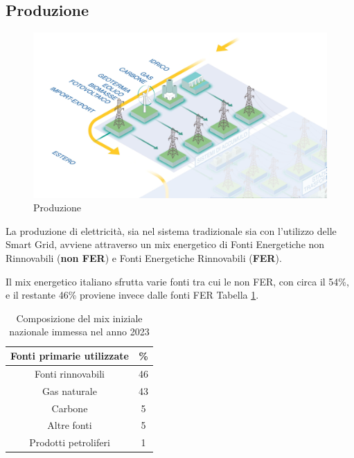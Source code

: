 
\newpage
\subsection{Produzione}

\begin{figure}[t]
    \centering
    \includegraphics[width=0.9\linewidth]{img/Terna-Produzione.png}
    \caption{Produzione}
\end{figure}

La produzione di elettricità, sia nel sistema tradizionale sia con l'utilizzo delle Smart Grid, avviene attraverso un mix energetico di Fonti Energetiche non Rinnovabili (\textbf{non FER}) e Fonti Energetiche Rinnovabili (\textbf{FER}).

Il mix energetico italiano sfrutta varie fonti tra cui le non FER, con circa il 54\%, e il restante 46\% proviene invece dalle fonti FER Tabella \ref{tab:GSE-mix-nazionale-2023}.


\begin{table}[h!]
    \renewcommand{\arraystretch}{1.2}
    \centering
    \begin{tabular}{c|c}
         Fonti primarie utilizzate	& \% \\
         \hline
         Fonti rinnovabili & 46 \\
         Gas naturale& 43 \\
         Carbone& 5 \\
         Altre fonti & 5 \\
         Prodotti petroliferi& 1 \\
    \end{tabular}
    \caption{Composizione del mix iniziale nazionale immessa nel anno 2023 \cite{GSE}}
    \label{tab:GSE-mix-nazionale-2023}
\end{table}



